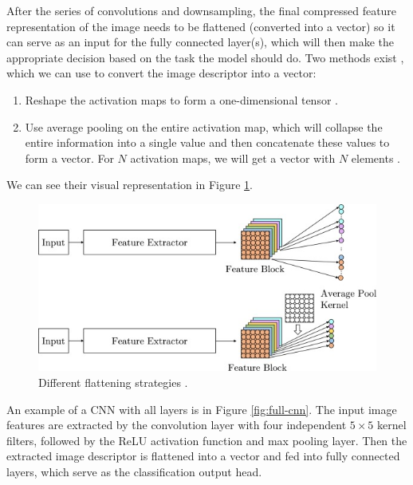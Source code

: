 After the series of convolutions and downsampling, the final compressed feature representation of the image needs to be flattened (converted into a vector) so it can serve as an input for the fully connected layer(s), which will then make the appropriate decision based on the task the model should do. Two methods exist \cite{Santosh2022-2}, which we can use to convert the image descriptor into a vector:

\begin{enumerate}
    \item Reshape the activation maps to form a one-dimensional tensor \cite{Krizhevsky2012, LeCun2015-2}.
    \item Use average pooling on the entire activation map, which will collapse the entire information into a single value and then concatenate these values to form a vector. For $N$ activation maps, we will get a vector with $N$ elements \cite{He2016, Szegedy2015}.
\end{enumerate}

We can see their visual representation in Figure \ref{fig:flatenning}.

\begin{figure}[H]
\begin{centering}
\includegraphics[width=12cm]{assets/images/flattening.jpg}
\par\end{centering}
\caption{Different flattening strategies \cite{Santosh2022-2}.}
\label{fig:flatenning}
\end{figure}

An example of a CNN with all layers is in Figure \ref{fig:full-cnn}. The input image features are extracted by the convolution layer with four independent $5\!\times\!5$ kernel filters, followed by the ReLU activation function and max pooling layer. Then the extracted image descriptor is flattened into a vector and fed into fully connected layers, which serve as the classification output head.

